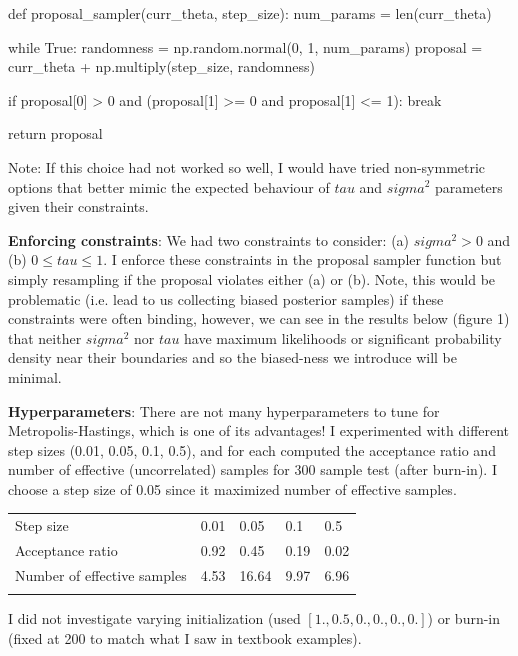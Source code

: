 \documentclass[12pt,letterpaper,twoside]{article}
\begin{document}
\begin{python}
    def proposal_sampler(curr_theta, step_size):
    num_params = len(curr_theta)

    while True:
        randomness = np.random.normal(0, 1, num_params)
        proposal = curr_theta + np.multiply(step_size, randomness)

        if proposal[0] > 0 and (proposal[1] >= 0 and proposal[1] <= 1):
            break

    return proposal
\end{python}

Note: If this choice had not worked so well, I would have tried non-symmetric 
options that better mimic the expected behaviour of $tau$ and $sigma^2$ parameters
given their constraints.

\textbf{Enforcing constraints}: We had two constraints to consider: (a) $sigma^2 > 0$ 
and (b) $0 \le tau \le 1$. I enforce these constraints in the proposal sampler function 
but simply resampling if the proposal violates either (a) or (b). Note, this would be 
problematic (i.e. lead to us collecting biased posterior samples) if these constraints were 
often binding, however, we can see in the results below (figure 1) that neither $sigma^2$ 
nor $tau$ have maximum likelihoods or significant probability density near their boundaries 
and so the biased-ness we introduce will be minimal. 

\textbf{Hyperparameters}: There are not many hyperparameters to 
tune for Metropolis-Hastings, which is one of its advantages! I 
experimented with different step sizes (0.01, 0.05, 0.1, 0.5), 
and for each computed the acceptance ratio and number of 
effective (uncorrelated) samples for 300 sample test (after 
burn-in). I choose a step size of 0.05 since it maximized 
number of effective samples.

\begin{table}[h]
    \begin{tabular}{lllll}
        Step size                   & 0.01 & 0.05  & 0.1   & 0.5   \\
        Acceptance ratio            & 0.92 & 0.45  & 0.19  & 0.02  \\
        Number of effective samples & 4.53 & 16.64 & 9.97  & 6.96  \\
                                    &      &       &       &         
    \end{tabular}
\end{table}

I did not investigate varying initialization (used $[1., 0.5, 0., 0., 0., 0.]$)
or burn-in (fixed at 200 to match what I saw in textbook examples).
\end{document}
